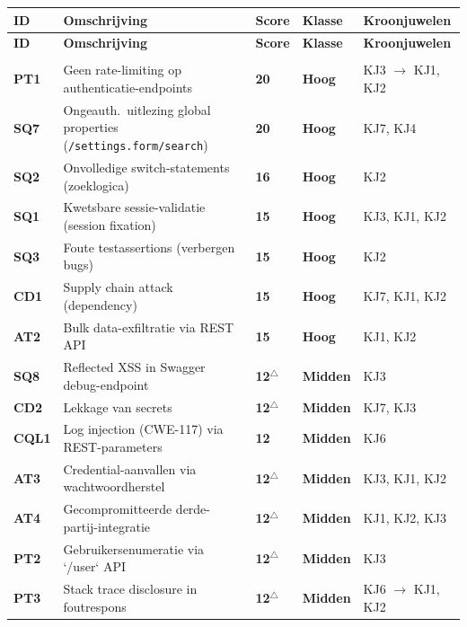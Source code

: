 \documentclass[12pt, a4paper]{report}
\newcommand{\rood}[1]{\textcolor{avansRed}{\textbf{#1}}}
\newcommand{\amber}[1]{\textcolor{ragAmber}{\textbf{#1}}}
\begin{document}
{\small
\begin{longtable}{@{}
    >{\raggedright\arraybackslash}p{1.3cm}
    >{\raggedright\arraybackslash}p{6.2cm}
    >{\centering\arraybackslash}p{1.0cm}
    >{\centering\arraybackslash}p{1.4cm}
    >{\raggedright\arraybackslash}p{3.4cm}@{}}
\toprule
\textbf{ID} & \textbf{Omschrijving} & \textbf{Score} & \textbf{Klasse} &
\textbf{Kroonjuwelen} \\
\midrule
\endfirsthead
\toprule
\textbf{ID} & \textbf{Omschrijving} & \textbf{Score} & \textbf{Klasse} &
\textbf{Kroonjuwelen} \\
\midrule
\endhead
\midrule
\multicolumn{5}{r}{\emph{vervolgt op volgende pagina}} \\
\endfoot
\bottomrule
\endlastfoot
\textbf{PT1} & Geen rate-limiting op authenticatie-endpoints   & \rood{20} & \rood{Hoog} & KJ3 $\to$ KJ1, KJ2 \\
\addlinespace
\textbf{SQ7} & Ongeauth.\ uitlezing global properties (\texttt{/settings.form/search}) & \rood{20} & \rood{Hoog} & KJ7, KJ4 \\
\addlinespace
\textbf{SQ2} & Onvolledige switch-statements (zoeklogica)      & \rood{16} & \rood{Hoog} & KJ2 \\
\addlinespace
\textbf{SQ1} & Kwetsbare sessie-validatie (session fixation)   & \rood{15} & \rood{Hoog} & KJ3, KJ1, KJ2 \\
\addlinespace
\textbf{SQ3} & Foute testassertions (verbergen bugs)           & \rood{15} & \rood{Hoog} & KJ2 \\
\addlinespace
\textbf{CD1} & Supply chain attack (dependency)                & \rood{15} & \rood{Hoog} & KJ7, KJ1, KJ2 \\
\addlinespace
\textbf{AT2} & Bulk data-exfiltratie via REST API              & \rood{15} & \rood{Hoog} & KJ1, KJ2 \\
\addlinespace
\textbf{SQ8} & Reflected XSS in Swagger debug-endpoint          & \amber{12}$^\triangle$ & \amber{Midden} & KJ3 \\
\addlinespace
\textbf{CD2} & Lekkage van secrets                              & \amber{12}$^\triangle$ & \amber{Midden} & KJ7, KJ3 \\
\addlinespace
\textbf{CQL1}& Log injection (CWE-117) via REST-parameters      & \amber{12} & \amber{Midden} & KJ6 \\
\addlinespace
\textbf{AT3} & Credential-aanvallen via wachtwoordherstel       & \amber{12}$^\triangle$ & \amber{Midden} & KJ3, KJ1, KJ2 \\
\addlinespace
\textbf{AT4} & Gecompromitteerde derde-partij-integratie        & \amber{12}$^\triangle$ & \amber{Midden} & KJ1, KJ2, KJ3 \\
\addlinespace
\textbf{PT2} & Gebruikersenumeratie via `/user` API & \amber{12}$^\triangle$ & \amber{Midden} & KJ3 \\
\addlinespace
\textbf{PT3} & Stack trace disclosure in foutrespons            & \amber{12}$^\triangle$ & \amber{Midden} & KJ6 $\to$ KJ1, KJ2 \\
\end{longtable}
}
\end{document}
